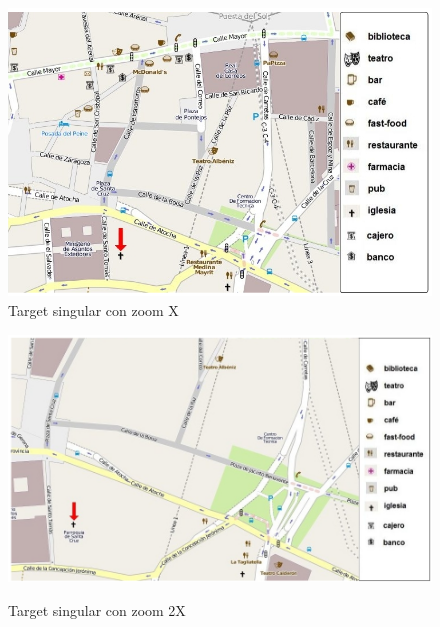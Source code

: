 \begin{figure}[!ht]
\begin{minipage}[b]{0.46\linewidth}
\centering
\includegraphics[width=\textwidth]{images/corpus/mapa6.png}\\[0pt]
\caption{Target singular con zoom X}
\label{singularx}
\end{minipage}
\begin{minipage}[b]{0.54\linewidth}
\centering
\includegraphics[width=\textwidth]{images/corpus/mapa16.png}\\[0pt]
\caption{Target singular con zoom 2X}
\label{singular2x}
\end{minipage}
\end{figure}


